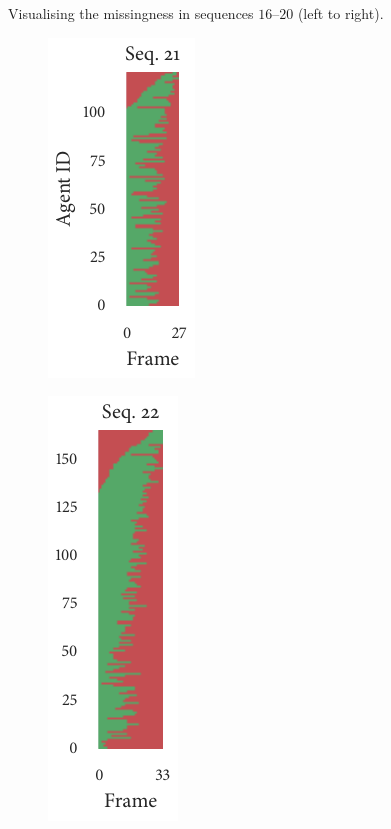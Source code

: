 \begin{figure}[t]
\begin{subfigure}[b]{0.2\textwidth}
	\end{subfigure}%
	\caption{Visualising the missingness in sequences $16$--$20$ (left to right).}
\end{figure}

\begin{figure}[b]
	\begin{subfigure}[b]{0.2\textwidth}
		\centering
		\includegraphics{missingness_sequence21.pdf}
	\end{subfigure}%
	\begin{subfigure}[b]{0.2\textwidth}
		\centering
		\includegraphics{missingness_sequence22.pdf}
	\end{subfigure}%
	\begin{subfigure}[b]{0.2\textwidth}

\end{subfigure}
\end{figure}
